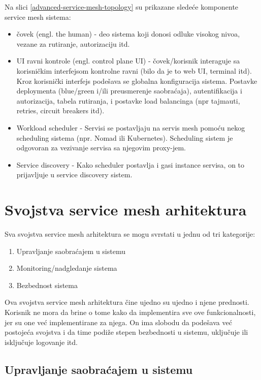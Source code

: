 \documentclass[a4paper,12pt]{report}
\begin{document}
Na slici \ref{advanced-service-mesh-topology} su prikazane sledeće komponente service mesh sistema: 

\begin{itemize}
	\item čovek (engl. the human) - deo sistema koji donosi odluke visokog nivoa, vezane za rutiranje, autorizaciju itd. 
	\item UI ravni kontrole (engl. control plane UI) - čovek/korisnik interaguje sa korisničkim interfejsom kontrolne ravni (bilo da je to web UI, terminal itd). Kroz korisnički interfejs podešava se globalna konfiguracija sistema. Postavke deploymenta (blue/green i/ili preusmerenje saobraćaja), autentifikacija i autorizacija, tabela rutiranja, i postavke load balancinga (npr tajmauti, retries, circuit breakers itd).
	\item Workload scheduler - Servisi se postavljaju na servis mesh pomoću nekog scheduling sistema (npr. Nomad ili Kubernetes). Scheduling sistem je odgovoran za vezivanje servisa sa njegovim proxy-jem.
	\item Service discovery - Kako scheduler postavlja i gasi instance servisa, on to prijavljuje u service discovery sistem. 
\end{itemize}


\chapter{Svojstva service mesh arhitektura}

Sva svojstva service mesh arhitektura se mogu svrstati u jednu od tri kategorije:

\begin{enumerate}
	\item Upravljanje saobraćajem u sistemu
	\item Monitoring/nadgledanje sistema
	\item Bezbednost sistema
\end{enumerate}

Ova svojstva service mesh arhitektura čine ujedno su ujedno i njene prednosti. Korisnik ne mora da brine o tome kako da implementira sve ove funkcionalnosti, jer su one već implementirane za njega. On ima slobodu da podešava već postojeća svojstva i da time podiže stepen bezbednosti u sistemu, uključuje ili isključuje logovanje itd. 

\section{Upravljanje saobraćajem u sistemu}
\end{document}
